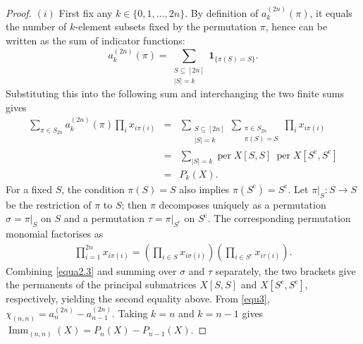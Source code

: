 \documentclass[11pt,a4paper]{article}
\begin{document}
\begin{proof}
$(i)$ First fix any $k\in\{0,1,\ldots,2n\}$. By definition of $a_k^{(2n)}(\pi)$, it equals the number of $k$-element subsets fixed by the permutation $\pi$, hence can be written as the sum of indicator functions:
\[
  a_k^{(2n)}(\pi)
  =\sum_{\substack{S\subseteq[2n]\\|S|=k}}
    \mathbf{1}_{\{\pi(S)=S\}}.
\]
Substituting this into the following sum and interchanging the two finite sums gives
\begin{eqnarray*}
  \sum_{\pi\in S_{2n}}a_k^{(2n)}(\pi)
    \prod_i x_{i\pi(i)}
  &=&\sum_{\substack{S\subseteq[2n]\\|S|=k}}
    \sum_{\substack{\pi\in S_{2n}\\\pi(S)=S}}
    \prod_i x_{i\pi(i)}  \\
  &=&\sum_{|S|=k}\operatorname{per} X[S,S]~\operatorname{per} X[S^{\mathrm{c}},S^{\mathrm{c}}]  \\
  &=&P_k(X).
\end{eqnarray*}
For a fixed $S$, the condition $\pi(S)=S$ also implies $\pi(S^{\mathrm{c}})=S^{\mathrm{c}}$. Let $\pi|_S:S\to S$ be the restriction of $\pi$ to $S$; then $\pi$ decomposes uniquely as a permutation $\sigma=\pi|_S$ on $S$ and a permutation $\tau=\pi|_{S^{\mathrm{c}}}$ on $S^{\mathrm{c}}$. The corresponding permutation monomial factorises as
\begin{eqnarray}\label{equa2.3}
  \prod_{i=1}^{2n}x_{i\pi(i)}
  =\left(\prod_{i\in S}x_{i\sigma(i)}\right)
   \left(\prod_{i\in S^{\mathrm{c}}}x_{i\tau(i)}\right).
\end{eqnarray}
Combining \eqref{equa2.3} and summing over $\sigma$ and $\tau$ separately, the two brackets give the permanents of the principal submatrices $X[S,S]$ and $X[S^{\mathrm{c}},S^{\mathrm{c}}]$, respectively, yielding the second equality above. From \eqref{equ3}, $\chi_{(n,n)}=a_n^{(2n)}-a_{n-1}^{(2n)}$. Taking $k=n$ and $k=n-1$ gives $\operatorname{Imm}_{(n,n)}(X)=P_n(X)-P_{n-1}(X)$.


\end{proof}
\end{document}
